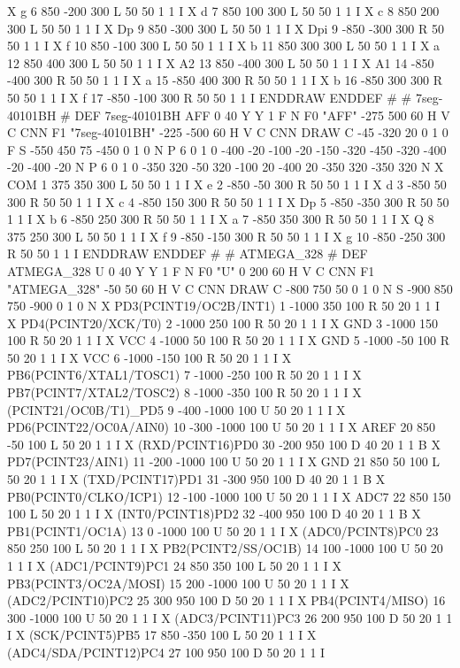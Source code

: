 X g 6 850 -200 300 L 50 50 1 1 I
X d 7 850 100 300 L 50 50 1 1 I
X c 8 850 200 300 L 50 50 1 1 I
X Dp 9 850 -300 300 L 50 50 1 1 I
X Dpi 9 -850 -300 300 R 50 50 1 1 I
X f 10 850 -100 300 L 50 50 1 1 I
X b 11 850 300 300 L 50 50 1 1 I
X a 12 850 400 300 L 50 50 1 1 I
X A2 13 850 -400 300 L 50 50 1 1 I
X A1 14 -850 -400 300 R 50 50 1 1 I
X a 15 -850 400 300 R 50 50 1 1 I
X b 16 -850 300 300 R 50 50 1 1 I
X f 17 -850 -100 300 R 50 50 1 1 I
ENDDRAW
ENDDEF
#
# 7seg-40101BH
#
DEF 7seg-40101BH AFF 0 40 Y Y 1 F N
F0 "AFF" -275 500 60 H V C CNN
F1 "7seg-40101BH" -225 -500 60 H V C CNN
DRAW
C -45 -320 20 0 1 0 F
S -550 450 75 -450 0 1 0 N
P 6 0 1 0  -400 -20  -100 -20  -150 -320  -450 -320  -400 -20  -400 -20 N
P 6 0 1 0  -350 320  -50 320  -100 20  -400 20  -350 320  -350 320 N
X COM 1 375 350 300 L 50 50 1 1 I
X e 2 -850 -50 300 R 50 50 1 1 I
X d 3 -850 50 300 R 50 50 1 1 I
X c 4 -850 150 300 R 50 50 1 1 I
X Dp 5 -850 -350 300 R 50 50 1 1 I
X b 6 -850 250 300 R 50 50 1 1 I
X a 7 -850 350 300 R 50 50 1 1 I
X Q 8 375 250 300 L 50 50 1 1 I
X f 9 -850 -150 300 R 50 50 1 1 I
X g 10 -850 -250 300 R 50 50 1 1 I
ENDDRAW
ENDDEF
#
# ATMEGA_328
#
DEF ATMEGA_328 U 0 40 Y Y 1 F N
F0 "U" 0 200 60 H V C CNN
F1 "ATMEGA_328" -50 50 60 H V C CNN
DRAW
C -800 750 50 0 1 0 N
S -900 850 750 -900 0 1 0 N
X PD3(PCINT19/OC2B/INT1) 1 -1000 350 100 R 50 20 1 1 I
X PD4(PCINT20/XCK/T0) 2 -1000 250 100 R 50 20 1 1 I
X GND 3 -1000 150 100 R 50 20 1 1 I
X VCC 4 -1000 50 100 R 50 20 1 1 I
X GND 5 -1000 -50 100 R 50 20 1 1 I
X VCC 6 -1000 -150 100 R 50 20 1 1 I
X PB6(PCINT6/XTAL1/TOSC1) 7 -1000 -250 100 R 50 20 1 1 I
X PB7(PCINT7/XTAL2/TOSC2) 8 -1000 -350 100 R 50 20 1 1 I
X (PCINT21/OC0B/T1)_PD5 9 -400 -1000 100 U 50 20 1 1 I
X PD6(PCINT22/OC0A/AIN0) 10 -300 -1000 100 U 50 20 1 1 I
X AREF 20 850 -50 100 L 50 20 1 1 I
X (RXD/PCINT16)PD0 30 -200 950 100 D 40 20 1 1 B
X PD7(PCINT23/AIN1) 11 -200 -1000 100 U 50 20 1 1 I
X GND 21 850 50 100 L 50 20 1 1 I
X (TXD/PCINT17)PD1 31 -300 950 100 D 40 20 1 1 B
X PB0(PCINT0/CLKO/ICP1) 12 -100 -1000 100 U 50 20 1 1 I
X ADC7 22 850 150 100 L 50 20 1 1 I
X (INT0/PCINT18)PD2 32 -400 950 100 D 40 20 1 1 B
X PB1(PCINT1/OC1A) 13 0 -1000 100 U 50 20 1 1 I
X (ADC0/PCINT8)PC0 23 850 250 100 L 50 20 1 1 I
X PB2(PCINT2/SS/OC1B) 14 100 -1000 100 U 50 20 1 1 I
X (ADC1/PCINT9)PC1 24 850 350 100 L 50 20 1 1 I
X PB3(PCINT3/OC2A/MOSI) 15 200 -1000 100 U 50 20 1 1 I
X (ADC2/PCINT10)PC2 25 300 950 100 D 50 20 1 1 I
X PB4(PCINT4/MISO) 16 300 -1000 100 U 50 20 1 1 I
X (ADC3/PCINT11)PC3 26 200 950 100 D 50 20 1 1 I
X (SCK/PCINT5)PB5 17 850 -350 100 L 50 20 1 1 I
X (ADC4/SDA/PCINT12)PC4 27 100 950 100 D 50 20 1 1 I
